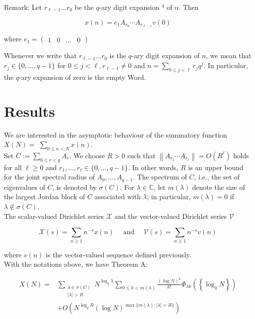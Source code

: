 \documentclass[10pt]{article}
\begin{document}
Remark: Let $r_{\ell-1} \ldots r_{0}$ be the $q$-ary digit expansion ${ }^{4}$ of $n$. Then

$$
x(n)=e_{1} A_{r_{0}} \cdots A_{r_{\ell-1}} v(0)
$$

where $e_{1}=\left(\begin{array}{llll}1 & 0 & \ldots & 0\end{array}\right)$

Whenever we write that $r_{\ell-1} \ldots r_{0}$ is the $q$-ary digit expansion of $n$, we mean that $r_{j} \in\{0, \ldots, q-1\}$ for $0 \leq j<\ell, r_{\ell-1} \neq 0$ and $n=\sum_{0 \leq j<\ell} r_{j} q^{j}$. In particular, the $q$-ary expansion of zero is the empty Word.

\newpage
\section{Results}

We are interested in the asymptotic behaviour of the summatory function $X(N)=$ $\sum_{0 \leq n<N} x(n)$.
\\

Set $C:=\sum_{0 \leq r<q} A_{r}$. We choose $R>0$ such that $\left\|A_{r_{1}} \cdots A_{r_{\ell}}\right\|=O\left(R^{\ell}\right)$ holds for all $\ell \geq 0$ and $r_{1}, \ldots, r_{\ell} \in\{0, \ldots, q-1\}$. In other words, $R$ is an upper bound for the joint spectral radius of $A_{0}, \ldots, A_{q-1}$. The spectrum of $C$, i.e., the set of eigenvalues of $C$, is denoted by $\sigma(C)$. For $\lambda \in \mathbb{C}$, let $m(\lambda)$ denote the size of the largest Jordan block of $C$ associated with $\lambda$; in particular, $m(\lambda)=0$ if $\lambda \notin \sigma(C)$. 
\\

The scalar-valued Dirichlet series $\mathcal{X}$ and the vector-valued Dirichlet series $\mathcal{V}$ 

$$
\mathcal{X}(s)=\sum_{n \geq 1} n^{-s} x(n) \quad \text { and } \quad \mathcal{V}(s)=\sum_{n \geq 1} n^{-s} v(n)
$$

where $v(n)$ is the vector-valued sequence defined previously.
\\

With the notations above, we have Theorem A:

$$
\begin{aligned}
	X(N)= & \sum_{\substack{\lambda \in \sigma(C) \\
			|\lambda|>R}} N^{\log _{q} \lambda} \sum_{0 \leq k<m(\lambda)} \frac{(\log N)^{k}}{k !} \Phi_{\lambda k}\left(\left\{\log _{q} N\right\}\right) \\
	& +O\left(N^{\log _{q} R}(\log N)^{\max \{m(\lambda):|\lambda|=R\}}\right)
\end{aligned}
$$
\end{document}
